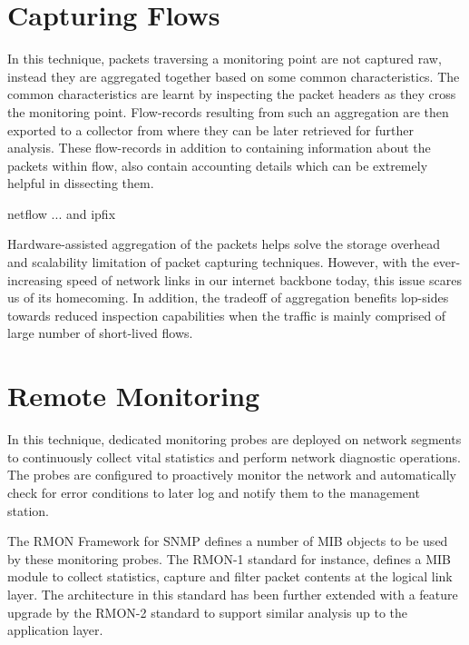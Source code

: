 

\section{Capturing Flows}\label{sec:capturing-flows}
In this technique, packets traversing a monitoring point are not captured raw, instead they are aggregated together based on some common characteristics. The common characteristics are learnt by inspecting the packet headers as they cross the monitoring point. Flow-records resulting from such an aggregation are then exported to a collector from where they can be later retrieved for further analysis. These flow-records in addition to containing information about the packets within flow, also contain accounting details which can be extremely helpful in dissecting them. 

netflow {...} and ipfix \cite{...} 

Hardware-assisted aggregation of the packets helps solve the storage overhead and scalability limitation of packet capturing techniques. However, with the ever-increasing  speed of network links in our internet backbone today, this issue scares us of its homecoming. In addition, the tradeoff of aggregation benefits lop-sides towards reduced inspection capabilities when the traffic is mainly comprised of large number of short-lived flows. 


\section{Remote Monitoring}\label{sec:remote-monitoring}
In this technique, dedicated monitoring probes are deployed on network segments to continuously collect vital statistics and perform network diagnostic operations. The probes are configured to proactively monitor the network and automatically check for error conditions to later log and notify them to the management station. 

The \ac{RMON} Framework \cite{rfc3577} for \ac{SNMP} \cite{rfc1157} defines a number of \ac{MIB} objects to be used by these monitoring probes. The \ac{RMON}-1 standard \cite{rfc2819} for instance, defines a \ac{MIB}  module to collect statistics, capture and filter packet contents at the logical link layer. The architecture in this standard has been further extended with a feature upgrade by the \ac{RMON}-2 standard \cite{rfc4502} to support similar analysis up to the application layer.

